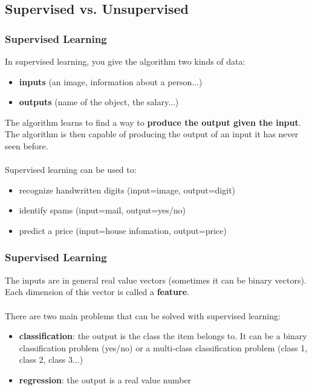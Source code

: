 \documentclass{beamer}
\begin{document}
\subsection{Supervised vs. Unsupervised}
\begin{frame}
  \frametitle{Supervised Learning}
  In supervised  learning, you give the algorithm two kinds of data:
  \begin{itemize}
    \item \textbf{inputs} (an image, information about a person...)
    \item \textbf{outputs} (name of the object, the salary...)
  \end{itemize}

  The algorithm learns to find a way to \textbf{produce the output given the
  input}. The algorithm is then capable of producing the output of an input it
  has never seen before. \\~\\
  Supervised learning can be used to:
  \begin{itemize}
    \item recognize handwritten digits (input=image, output=digit)
    \item identify spams (input=mail, output=yes/no)
    \item predict a price (input=house infomation, output=price)
  \end{itemize}
\end{frame}

\begin{frame}
  \frametitle{Supervised Learning}
  The inputs are in general real value vectors (sometimes it can be binary
  vectors). Each dimension of this vector is
  called a \textbf{feature}. \\~\\

  There are two main problems that can be solved with supervised learning:
  \begin{itemize}
    \item \textbf{classification}: the output is the class the item belongs to.
      It can be a binary classification problem (yes/no) or a multi-class
      classification problem (class 1, class 2, class 3...)
    \item \textbf{regression}: the output is a real value number
  \end{itemize}
\end{frame}
\end{document}
